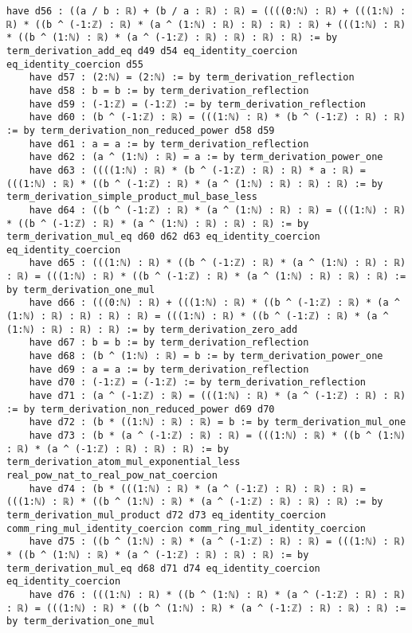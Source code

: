 \documentclass{article}
\begin{document}
\begin{tcolorbox}[colback=white!10, width=\linewidth]
\begin{lstlisting}[language=Lean4]
    have d56 : ((a / b : ℝ) + (b / a : ℝ) : ℝ) = ((((0:ℕ) : ℝ) + (((1:ℕ) : ℝ) * ((b ^ (-1:ℤ) : ℝ) * (a ^ (1:ℕ) : ℝ) : ℝ) : ℝ) : ℝ) + (((1:ℕ) : ℝ) * ((b ^ (1:ℕ) : ℝ) * (a ^ (-1:ℤ) : ℝ) : ℝ) : ℝ) : ℝ) := by term_derivation_add_eq d49 d54 eq_identity_coercion eq_identity_coercion d55
    have d57 : (2:ℕ) = (2:ℕ) := by term_derivation_reflection
    have d58 : b = b := by term_derivation_reflection
    have d59 : (-1:ℤ) = (-1:ℤ) := by term_derivation_reflection
    have d60 : (b ^ (-1:ℤ) : ℝ) = (((1:ℕ) : ℝ) * (b ^ (-1:ℤ) : ℝ) : ℝ) := by term_derivation_non_reduced_power d58 d59
    have d61 : a = a := by term_derivation_reflection
    have d62 : (a ^ (1:ℕ) : ℝ) = a := by term_derivation_power_one
    have d63 : ((((1:ℕ) : ℝ) * (b ^ (-1:ℤ) : ℝ) : ℝ) * a : ℝ) = (((1:ℕ) : ℝ) * ((b ^ (-1:ℤ) : ℝ) * (a ^ (1:ℕ) : ℝ) : ℝ) : ℝ) := by term_derivation_simple_product_mul_base_less
    have d64 : ((b ^ (-1:ℤ) : ℝ) * (a ^ (1:ℕ) : ℝ) : ℝ) = (((1:ℕ) : ℝ) * ((b ^ (-1:ℤ) : ℝ) * (a ^ (1:ℕ) : ℝ) : ℝ) : ℝ) := by term_derivation_mul_eq d60 d62 d63 eq_identity_coercion eq_identity_coercion
    have d65 : (((1:ℕ) : ℝ) * ((b ^ (-1:ℤ) : ℝ) * (a ^ (1:ℕ) : ℝ) : ℝ) : ℝ) = (((1:ℕ) : ℝ) * ((b ^ (-1:ℤ) : ℝ) * (a ^ (1:ℕ) : ℝ) : ℝ) : ℝ) := by term_derivation_one_mul
    have d66 : (((0:ℕ) : ℝ) + (((1:ℕ) : ℝ) * ((b ^ (-1:ℤ) : ℝ) * (a ^ (1:ℕ) : ℝ) : ℝ) : ℝ) : ℝ) = (((1:ℕ) : ℝ) * ((b ^ (-1:ℤ) : ℝ) * (a ^ (1:ℕ) : ℝ) : ℝ) : ℝ) := by term_derivation_zero_add
    have d67 : b = b := by term_derivation_reflection
    have d68 : (b ^ (1:ℕ) : ℝ) = b := by term_derivation_power_one
    have d69 : a = a := by term_derivation_reflection
    have d70 : (-1:ℤ) = (-1:ℤ) := by term_derivation_reflection
    have d71 : (a ^ (-1:ℤ) : ℝ) = (((1:ℕ) : ℝ) * (a ^ (-1:ℤ) : ℝ) : ℝ) := by term_derivation_non_reduced_power d69 d70
    have d72 : (b * ((1:ℕ) : ℝ) : ℝ) = b := by term_derivation_mul_one
    have d73 : (b * (a ^ (-1:ℤ) : ℝ) : ℝ) = (((1:ℕ) : ℝ) * ((b ^ (1:ℕ) : ℝ) * (a ^ (-1:ℤ) : ℝ) : ℝ) : ℝ) := by term_derivation_atom_mul_exponential_less real_pow_nat_to_real_pow_nat_coercion
    have d74 : (b * (((1:ℕ) : ℝ) * (a ^ (-1:ℤ) : ℝ) : ℝ) : ℝ) = (((1:ℕ) : ℝ) * ((b ^ (1:ℕ) : ℝ) * (a ^ (-1:ℤ) : ℝ) : ℝ) : ℝ) := by term_derivation_mul_product d72 d73 eq_identity_coercion comm_ring_mul_identity_coercion comm_ring_mul_identity_coercion
    have d75 : ((b ^ (1:ℕ) : ℝ) * (a ^ (-1:ℤ) : ℝ) : ℝ) = (((1:ℕ) : ℝ) * ((b ^ (1:ℕ) : ℝ) * (a ^ (-1:ℤ) : ℝ) : ℝ) : ℝ) := by term_derivation_mul_eq d68 d71 d74 eq_identity_coercion eq_identity_coercion
    have d76 : (((1:ℕ) : ℝ) * ((b ^ (1:ℕ) : ℝ) * (a ^ (-1:ℤ) : ℝ) : ℝ) : ℝ) = (((1:ℕ) : ℝ) * ((b ^ (1:ℕ) : ℝ) * (a ^ (-1:ℤ) : ℝ) : ℝ) : ℝ) := by term_derivation_one_mul

\end{lstlisting}
\end{tcolorbox}
\end{document}
